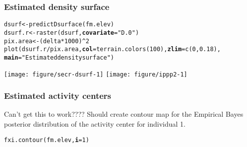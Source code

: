 \documentclass[color=usenames,dvipsnames]{beamer}\usepackage[]{graphicx}\usepackage[]{color}
\makeatletter
\newcommand{\hlnum}[1]{\textcolor[rgb]{0.69,0.494,0}{#1}}%
\newcommand{\hlstr}[1]{\textcolor[rgb]{0.749,0.012,0.012}{#1}}%
\newcommand{\hlopt}[1]{\textcolor[rgb]{0,0,0}{#1}}%
\newcommand{\hlstd}[1]{\textcolor[rgb]{0,0,0}{#1}}%
\newcommand{\hlkwb}[1]{\textcolor[rgb]{0,0.341,0.682}{#1}}%
\newcommand{\hlkwc}[1]{\textcolor[rgb]{0,0,0}{\textbf{#1}}}%
\newcommand{\hlkwd}[1]{\textcolor[rgb]{0.004,0.004,0.506}{#1}}%
\newenvironment{kframe}{%
 \def\at@end@of@kframe{}%
 \ifinner\ifhmode%
  \def\at@end@of@kframe{\end{minipage}}%
  \begin{minipage}{\columnwidth}%
 \fi\fi%
 \def\FrameCommand##1{\hskip\@totalleftmargin \hskip-\fboxsep
 \colorbox{shadecolor}{##1}\hskip-\fboxsep
     \hskip-\linewidth \hskip-\@totalleftmargin \hskip\columnwidth}%
 \MakeFramed {\advance\hsize-\width
   \@totalleftmargin\z@ \linewidth\hsize
   \@setminipage}}%
 {\par\unskip\endMakeFramed%
 \at@end@of@kframe}
\newenvironment{knitrout}{}{} %
\makeatother
\begin{document}
\begin{frame}[fragile]
  \frametitle{Estimated density surface}
\begin{knitrout}\scriptsize
{}\color{fgcolor}\begin{kframe}
\begin{alltt}
\hlstd{dsurf} \hlkwb{<-} \hlkwd{predictDsurface}\hlstd{(fm.elev)}
\hlstd{dsurf.r} \hlkwb{<-} \hlkwd{raster}\hlstd{(dsurf,} \hlkwc{covariate}\hlstd{=}\hlstr{"D.0"}\hlstd{)}
\hlstd{pix.area} \hlkwb{<-} \hlstd{(delta}\hlopt{*}\hlnum{1000}\hlstd{)}\hlopt{^}\hlnum{2}
\hlkwd{plot}\hlstd{(dsurf.r}\hlopt{/}\hlstd{pix.area,} \hlkwc{col}\hlstd{=}\hlkwd{terrain.colors}\hlstd{(}\hlnum{100}\hlstd{),} \hlkwc{zlim}\hlstd{=}\hlkwd{c}\hlstd{(}\hlnum{0}\hlstd{,}\hlnum{0.18}\hlstd{),}
     \hlkwc{main}\hlstd{=}\hlstr{"Estimated density surface"}\hlstd{)}
\end{alltt}
\end{kframe}
\end{knitrout}
\centering
\texttt{[image: figure/secr-dsurf-1]}
\texttt{[image: figure/ippp2-1]} \\
\end{frame}



\begin{frame}[fragile]
  \frametitle{Estimated activity centers}
  Can't get this to work???? Should create contour map for the
  Empirical Bayes posterior distribution of the activity center for
  individual 1. 
\begin{knitrout}\scriptsize
{}\color{fgcolor}\begin{kframe}
\begin{alltt}
\hlkwd{fxi.contour}\hlstd{(fm.elev,} \hlkwc{i}\hlstd{=}\hlnum{1}\hlstd{)}
\end{alltt}
\end{kframe}
\end{knitrout}
\end{frame}
\end{document}
